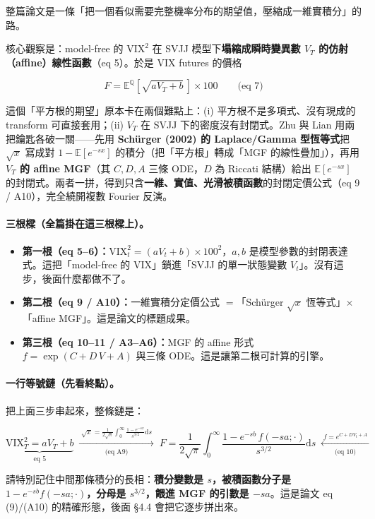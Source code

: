 \documentclass[12pt, a4paper]{article}
\theoremstyle{remark}
\newcommand{\E}{\mathbb{E}}
\newcommand{\Q}{\mathbb{Q}}
\newcommand{\dd}{\mathrm{d}}
\newcommand{\VIX}{\mathrm{VIX}}
\begin{document}
整篇論文是一條「把一個看似需要完整機率分布的期望值，壓縮成一維實積分」的路。

核心觀察是：model-free 的 $\VIX^2$ 在 SVJJ 模型下\textbf{塌縮成瞬時變異數 $V_T$ 的仿射（affine）線性函數}（eq 5）。於是 VIX futures 的價格

\[
  F = \E^\Q\!\left[\sqrt{aV_T+b}\,\right]\times 100
  \qquad\text{(eq 7)}
\]

這個「平方根的期望」原本卡在兩個難點上：(i) 平方根不是多項式、沒有現成的 transform 可直接套用；(ii) $V_T$ 在 SVJJ 下的密度沒有封閉式。Zhu 與 Lian 用兩把鑰匙各破一關——先用 \textbf{Schürger (2002) 的 Laplace/Gamma 型恆等式}把 $\sqrt{x}$ 寫成對 $1-\E[e^{-sx}]$ 的積分（把「平方根」轉成「MGF 的線性疊加」），再用 \textbf{$V_T$ 的 affine MGF}（其 $C,D,A$ 三條 ODE，$D$ 為 Riccati 結構）給出 $\E[e^{-sx}]$ 的封閉式。兩者一拼，得到只含\textbf{一維、實值、光滑被積函數}的封閉定價公式（eq 9 / A10），完全繞開複數 Fourier 反演。

\paragraph{三根樑（全篇掛在這三根樑上）。}
\begin{itemize}[topsep=2pt]
  \item \textbf{第一根（eq 5--6）：}$\VIX_t^2 = (aV_t+b)\times 100^2$，$a,b$ 是模型參數的封閉表達式。這把「model-free 的 VIX」鎖進「SVJJ 的單一狀態變數 $V_t$」。沒有這步，後面什麼都做不了。
  \item \textbf{第二根（eq 9 / A10）：}一維實積分定價公式 $=$「Schürger $\sqrt{x}$ 恆等式」$\times$「affine MGF」。這是論文的標題成果。
  \item \textbf{第三根（eq 10--11 / A3--A6）：}MGF 的 affine 形式 $f=\exp(C+D\,V+A)$ 與三條 ODE。這是讓第二根可計算的引擎。
\end{itemize}

\paragraph{一行等號鏈（先看終點）。}把上面三步串起來，整條鏈是：

\[
  \underbrace{\VIX_T^2 = aV_T+b}_{\text{eq 5}}
  \;\xrightarrow[\text{(eq A9)}]{\;\sqrt{x}=\frac{1}{2\sqrt\pi}\int_0^\infty\frac{1-e^{-sx}}{s^{3/2}}\dd s\;}\;
  F=\frac{1}{2\sqrt\pi}\!\int_0^\infty\!\frac{1-e^{-sb}\,f(-sa;\cdot)}{s^{3/2}}\dd s
  \;\xleftarrow[\text{(eq 10)}]{\;f=e^{C+DV_t+A}\;}
\]

請特別記住中間那條積分的長相：\textbf{積分變數是 $s$，被積函數分子是 $1-e^{-sb}f(-sa;\cdot)$，分母是 $s^{3/2}$，餵進 MGF 的引數是 $-sa$}。這是論文 eq (9)/(A10) 的精確形態，後面 §4.4 會把它逐步拼出來。
\end{document}
